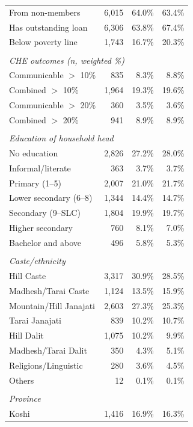 \begin{table}[htbp]
\begin{tabular}{lrrr}
\quad \quad From non-members & 6,015 & 64.0\% & 63.4\% \\
\quad Has outstanding loan & 6,306 & 63.8\% & 67.4\% \\
\quad Below poverty line & 1,743 & 16.7\% & 20.3\% \\
\\
\multicolumn{4}{l}{\textit{CHE outcomes (n, weighted \%)}} \\
\quad Communicable $>$ 10\% & 835 & 8.3\% & 8.8\% \\
\quad Combined $>$ 10\% & 1,964 & 19.3\% & 19.6\% \\
\quad Communicable $>$ 20\% & 360 & 3.5\% & 3.6\% \\
\quad Combined $>$ 20\% & 941 & 8.9\% & 8.9\% \\
\\
\multicolumn{4}{l}{\textit{Education of household head}} \\
\quad No education & 2,826 & 27.2\% & 28.0\% \\
\quad Informal/literate & 363 & 3.7\% & 3.7\% \\
\quad Primary (1--5) & 2,007 & 21.0\% & 21.7\% \\
\quad Lower secondary (6--8) & 1,344 & 14.4\% & 14.7\% \\
\quad Secondary (9--SLC) & 1,804 & 19.9\% & 19.7\% \\
\quad Higher secondary & 760 & 8.1\% & 7.0\% \\
\quad Bachelor and above & 496 & 5.8\% & 5.3\% \\
\\
\multicolumn{4}{l}{\textit{Caste/ethnicity}} \\
\quad Hill Caste & 3,317 & 30.9\% & 28.5\% \\
\quad Madhesh/Tarai Caste & 1,124 & 13.5\% & 15.9\% \\
\quad Mountain/Hill Janajati & 2,603 & 27.3\% & 25.3\% \\
\quad Tarai Janajati & 839 & 10.2\% & 10.7\% \\
\quad Hill Dalit & 1,075 & 10.2\% & 9.9\% \\
\quad Madhesh/Tarai Dalit & 350 & 4.3\% & 5.1\% \\
\quad Religions/Linguistic & 280 & 3.6\% & 4.5\% \\
\quad Others & 12 & 0.1\% & 0.1\% \\
\\
\multicolumn{4}{l}{\textit{Province}} \\
\quad Koshi & 1,416 & 16.9\% & 16.3\% \\

\end{tabular}
\end{table}
